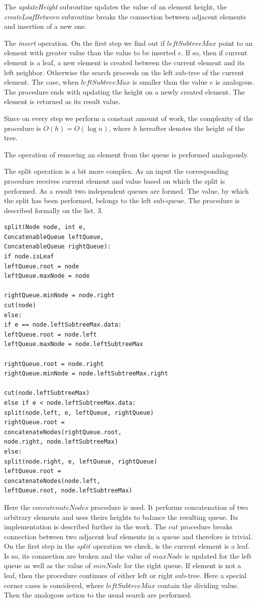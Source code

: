 \documentclass[conference]{IEEEtran}
\theoremstyle{plane}
\begin{document}
The \textit{updateHeight} subroutine updates the value of an element height, the \textit{createLeafBetween} subroutine breaks the connection between adjacent elements and insertion of a new one. 

The \textit{insert} operation. On the first step we find out if $leftSubtreeMax$ point to an element with greater value than the value to be inserted $e$. If so, then if current element is a leaf, a new element is created between the current element and its left neighbor. Otherwise the search proceeds on the left sub-tree of the current element. The case, when $leftSubtreeMax$ is smaller than the value $e$ is analogous. The procedure ends with updating the height on a newly created element. The element is returned as its result value.

Since on every step we perform a constant amount of work, the complexity of the procedure is $O(h)=O(\log n)$, where $h$ hereafter denotes the height of the tree.

The operation of removing an element from the queue is performed analogously. 

The split operation is a bit more complex. As an input the corresponding procedure receives current element and value based on which the split is performed. As a result two independent queues are formed. The value, by which the split has been performed, belongs to the left sub-queue. The procedure is described formally on the list. 3.

\begin{lstlisting}[caption={Queue plit algorithm},captionpos=b]
split(Node node, int e, 
ConcatenableQueue leftQueue, 
ConcatenableQueue rightQueue): 
if node.isLeaf
leftQueue.root = node
leftQueue.maxNode = node	

rightQueue.minNode = node.right	
cut(node)
else:
if e == node.leftSubtreeMax.data:
leftQueue.root = node.left
leftQueue.maxNode = node.leftSubtreeMax

rightQueue.root = node.right
rightQueue.minNode = node.leftSubtreeMax.right

cut(node.leftSubtreeMax)
else if e < node.leftSubtreeMax.data:
split(node.left, e, leftQueue, rightQueue)
rightQueue.root =
concatenateNodes(rightQueue.root, 
node.right, node.leftSubtreeMax)
else:
split(node.right, e, leftQueue, rightQueue)
leftQueue.root = 
concatenateNodes(node.left, 
leftQueue.root, node.leftSubtreeMax)
\end{lstlisting}

Here the $concatenateNodes$ procedure is used. It performs concatenation of two arbitrary elements and uses theirs heights to balance the resulting queue. Its implementation is described further in the work. The $cut$ procedure breaks connection between two adjacent leaf elements in a queue and therefore is trivial. On the first step in the $split$ operation we check, is the current element is a leaf. Is so, its connection are broken and the value of $maxNode$ is updated for the left queue as well as the value of $minNode$ for the right queue. If element is not a leaf, then the procedure continues of either left or right sub-tree. Here a special corner cases is considered, where $leftSubtreeMax$ contain the dividing value. Then the analogous action to the usual search are performed.
\end{document}
